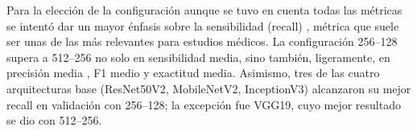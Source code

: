 Para la elección de la configuración aunque se tuvo en cuenta todas las métricas se
intentó dar un mayor énfasis sobre la sensibilidad (recall) , métrica que suele ser unas
de las más relevantes para estudios médicos. La configuración 256–128 supera a 512–256 no
solo en sensibilidad media, sino también, ligeramente, en precisión media , F1 medio y
exactitud media. Asimismo, tres de las cuatro arquitecturas base (ResNet50V2, MobileNetV2,
InceptionV3) alcanzaron su mejor recall en validación con 256–128; la excepción fue VGG19,
cuyo mejor resultado se dio con 512–256.
